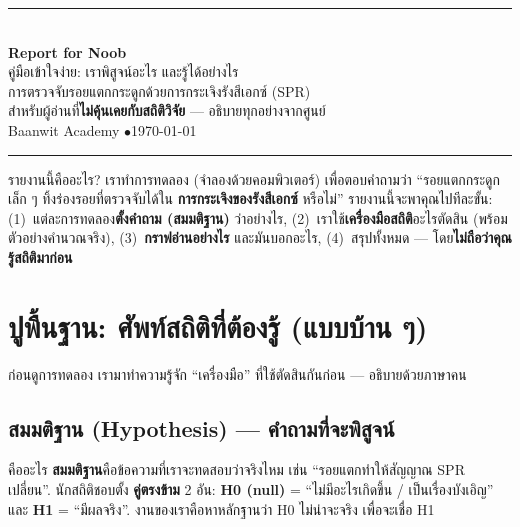 \documentclass[17pt]{extarticle}
\begin{document}
\begin{center}
{\color{theme}\rule{\linewidth}{2.5pt}}\\[8pt]
{\Huge\bfseries\color{themeD} Report for Noob}\\[6pt]
{\Large\color{theme} คู่มือเข้าใจง่าย: เราพิสูจน์อะไร และรู้ได้อย่างไร}\\[6pt]
{\large การตรวจจับรอยแตกกระดูกด้วยการกระเจิงรังสีเอกซ์ (SPR)}\\[3pt]
{\small สำหรับผู้อ่านที่\textbf{ไม่คุ้นเคยกับสถิติวิจัย} --- อธิบายทุกอย่างจากศูนย์}\\[3pt]
{\small Baanwit Academy \quad$\bullet$\quad \today}\\[6pt]
{\color{theme}\rule{\linewidth}{2.5pt}}
\end{center}
\vspace{4pt}

\begin{concept}{รายงานนี้คืออะไร?}
เราทำการทดลอง (จำลองด้วยคอมพิวเตอร์) เพื่อตอบคำถามว่า ``รอยแตกกระดูกเล็ก ๆ ทิ้งร่องรอยที่ตรวจจับได้ใน
\textbf{การกระเจิงของรังสีเอกซ์} หรือไม่'' รายงานนี้จะพาคุณไปทีละขั้น: (1)~แต่ละการทดลอง\textbf{ตั้งคำถาม (สมมติฐาน)}
ว่าอย่างไร, (2)~เราใช้\textbf{เครื่องมือสถิติ}อะไรตัดสิน (พร้อมตัวอย่างคำนวณจริง), (3)~\textbf{กราฟอ่านอย่างไร}
และมันบอกอะไร, (4)~สรุปทั้งหมด --- โดย\textbf{ไม่ถือว่าคุณรู้สถิติมาก่อน}
\end{concept}

\vspace{2pt}
{\small\tableofcontents}
\clearpage

\section{ปูพื้นฐาน: ศัพท์สถิติที่ต้องรู้ (แบบบ้าน ๆ)}
ก่อนดูการทดลอง เรามาทำความรู้จัก ``เครื่องมือ'' ที่ใช้ตัดสินกันก่อน --- อธิบายด้วยภาษาคน

\subsection{สมมติฐาน (Hypothesis) --- คำถามที่จะพิสูจน์}
\begin{concept}{คืออะไร}
\textbf{สมมติฐาน}คือข้อความที่เราจะทดสอบว่าจริงไหม เช่น ``รอยแตกทำให้สัญญาณ SPR เปลี่ยน''. นักสถิติชอบตั้ง
\textbf{คู่ตรงข้าม} 2 อัน: \textbf{H0 (null)} = ``ไม่มีอะไรเกิดขึ้น / เป็นเรื่องบังเอิญ'' และ \textbf{H1} = ``มีผลจริง''.
งานของเราคือหาหลักฐานว่า H0 ไม่น่าจะจริง เพื่อจะเชื่อ H1
\end{concept}
\end{document}
